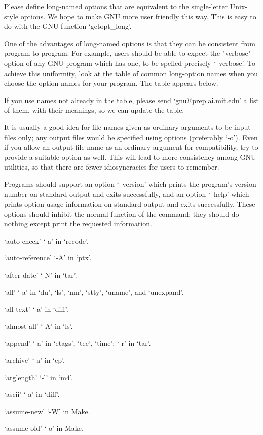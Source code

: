    Please define long-named options that are equivalent to the
single-letter Unix-style options.  We hope to make GNU more user
friendly this way.  This is easy to do with the GNU function
`getopt_long'.

   One of the advantages of long-named options is that they can be
consistent from program to program.  For example, users should be able
to expect the "verbose" option of any GNU program which has one, to be
spelled precisely `--verbose'.  To achieve this uniformity, look at the
table of common long-option names when you choose the option names for
your program.  The table appears below.

   If you use names not already in the table, please send
`gnu@prep.ai.mit.edu' a list of them, with their meanings, so we can
update the table.

   It is usually a good idea for file names given as ordinary arguments
to be input files only; any output files would be specified using
options (preferably `-o').  Even if you allow an output file name as an
ordinary argument for compatibility, try to provide a suitable option
as well.  This will lead to more consistency among GNU utilities, so
that there are fewer idiosyncracies for users to remember.

   Programs should support an option `--version' which prints the
program's version number on standard output and exits successfully, and
an option `--help' which prints option usage information on standard
output and exits successfully.  These options should inhibit the normal
function of the command; they should do nothing except print the
requested information.

`auto-check'
     `-a' in `recode'.

`auto-reference'
     `-A' in `ptx'.

`after-date'
     `-N' in `tar'.

`all'
     `-a' in `du', `ls', `nm', `stty', `uname', and `unexpand'.

`all-text'
     `-a' in `diff'.

`almost-all'
     `-A' in `ls'.

`append'
     `-a' in `etags', `tee', `time'; `-r' in `tar'.

`archive'
     `-a' in `cp'.

`arglength'
     `-l' in `m4'.

`ascii'
     `-a' in `diff'.

`assume-new'
     `-W' in Make.

`assume-old'
     `-o' in Make.

